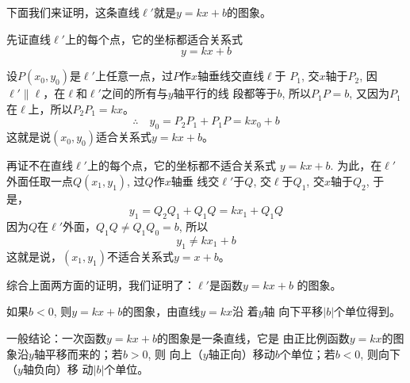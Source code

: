 \begin{figure}[htp]
    \centering
{}
    \caption{}
\end{figure}

下面我们来证明，这条直线$\ell'$就是$y=kx+b$的图象。

先证直线$\ell'$上的每个点，它的坐标都适合关系式
\[y=kx+b\]

设$P(x_0,y_0)$是$\ell'$上任意一点，过$P$作$x$轴垂线交直线$\ell$于
$P_1$, 交$x$轴于$P_2$, 因$\ell'\parallel \ell$，在$\ell$和$\ell'$之间的所有与$y$轴平行的线
段都等于$b$, 所以$P_1P=b$, 又因为$P_1$在$\ell$上，所以$P_2P_1=kx$。
\[\therefore\quad y_0=P_2P_1+P_1P=kx_0+b\]
这就是说$(x_0,y_0)$适合关系式$y=kx+b$。

再证不在直线$\ell'$上的每个点，它的坐标都不适合关系式
$y=kx+b$. 为此，在$\ell'$外面任取一点$Q(x_1,y_1)$, 过$Q$作$x$轴垂
线交$\ell'$于$Q$, 交$\ell$于$Q_1$, 交$x$轴于$Q_2$, 于是，
\[y_1=Q_2Q_1+Q_1Q=kx_1+Q_1Q\]
因为$Q$在$\ell'$外面，$Q_1Q\ne Q_1Q_0=b$, 所以
\[y_1\ne kx_1+b\]
这就是说，$(x_1,y_1)$不适合关系式$y=x+b$。

综合上面两方面的证明，我们证明了：$\ell'$是函数$y=kx+b$
的图象。

如果$b<0$, 则$y=kx+b$的图象，由直线$y=kx$沿 着$y$轴
向下平移$|b|$个单位得到。

一般结论：一次函数$y=kx+b$的图象是一条直线，它是
由正比例函数$y=kx$的图象沿$y$轴平移而来的；若$b>0$, 则
向上（$y$轴正向）移动$b$个单位；若$b<0$, 则向下（$y$轴负向）移
动$|b|$个单位。

